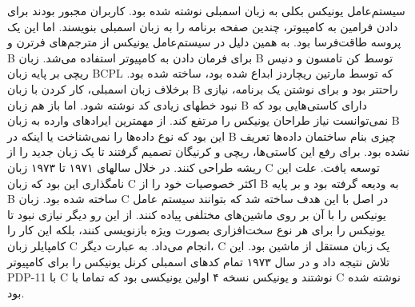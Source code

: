 سیستم‌عامل یونیکس بکلی به زبان اسمبلی نوشته شده بود. کاربران مجبور بودند برای دادن فرامین به کامپیوتر، چندین صفحه برنامه را به زبان اسمبلی بنویسند. اما این یک پروسه طاقت‌فرسا بود. به همین دلیل در سیستم‌عامل یونیکس از مترجم‌های فرترن و B برای فرمان دادن به کامپیوتر استفاده می‌شد. زبان B توسط کن تامسون و دنیس ریچی بر پایه زبان BCPL که توسط مارتین ریچاردز ابداع شده بود، ساخته شده بود. برخلاف زبان اسمبلی، کار کردن با زبان B راحتتر بود و برای نوشتن یک برنامه، نیازی نبود خطهای زیادی کد نوشته شود. اما باز هم زبان B دارای کاستی‌هایی بود که نمی‌توانست نیاز طراحان یونیکس را مرتفع کند. از مهمترین ایرادهای وارده به زبان B این بود که نوع داده‌ها را نمی‌شناخت یا اینکه در B چیزی بنام ساختمان داده‌ها تعریف نشده بود. برای رفع این کاستی‌ها، ریچی و کرنیگان تصمیم گرفتند تا یک زبان جدید را از ریشه طراحی کنند. در خلال سالهای ۱۹۷۱ تا ۱۹۷۳ زبان C توسعه یافت. علت این نامگذاری این بود که زبان C اکثر خصوصیات خود را از B به ودیعه گرفته بود و بر پایه B ساخته شده بود. زبان C در اصل با این هدف ساخته شد که بتوانند سیستم عامل یونیکس را با آن بر روی ماشین‌های مختلفی پیاده کنند. از این رو دیگر نیازی نبود تا یونیکس را برای هر نوع سخت‌افزاری بصورت ویژه بازنویسی کنند، بلکه این کار را کامپایلر زبان C انجام می‌داد. به عبارت دیگر، C یک زبان مستقل از ماشین بود. این تلاش نتیجه داد و در سال ۱۹۷۳ تمام کدهای اسمبلی کرنل یونیکس را برای کامپیوتر PDP-11 با C نوشتند و یونیکس نسخه ۴ اولین یونیکسی بود که تماما با C نوشته شده بود.